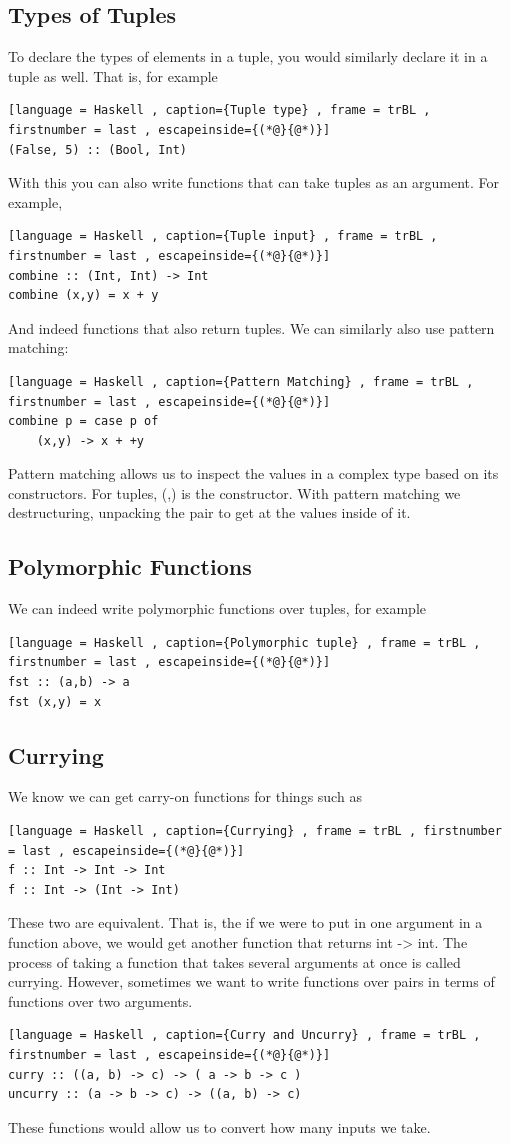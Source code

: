 \documentclass[a4paper]{article}
\theoremstyle{plain}
\theoremstyle{definition}
\theoremstyle{remark}
\begin{document}
\subsection{Types of Tuples}
To declare the types of elements in a tuple, you would similarly declare it in a tuple as well. That is, for example	
\begin{lstlisting}[language = Haskell , caption={Tuple type} , frame = trBL , firstnumber = last , escapeinside={(*@}{@*)}]
(False, 5) :: (Bool, Int)
\end{lstlisting}
With this you can also write functions that can take tuples as an argument. For example,
\begin{lstlisting}[language = Haskell , caption={Tuple input} , frame = trBL , firstnumber = last , escapeinside={(*@}{@*)}]
combine :: (Int, Int) -> Int
combine (x,y) = x + y
\end{lstlisting}
And indeed functions that also return tuples.
We can similarly also use pattern matching:
\begin{lstlisting}[language = Haskell , caption={Pattern Matching} , frame = trBL , firstnumber = last , escapeinside={(*@}{@*)}]
combine p = case p of
	(x,y) -> x + +y
\end{lstlisting}
Pattern matching allows us to inspect the values in a complex type based on its constructors. For tuples, (,) is the constructor. With pattern matching we destructuring, unpacking the pair to get at the values inside of it.
\subsection{Polymorphic Functions}
We can indeed write polymorphic functions over tuples, for example
\begin{lstlisting}[language = Haskell , caption={Polymorphic tuple} , frame = trBL , firstnumber = last , escapeinside={(*@}{@*)}]
fst :: (a,b) -> a
fst (x,y) = x
\end{lstlisting}
\subsection{Currying}
We know we can get carry-on functions for things such as
\begin{lstlisting}[language = Haskell , caption={Currying} , frame = trBL , firstnumber = last , escapeinside={(*@}{@*)}]
f :: Int -> Int -> Int
f :: Int -> (Int -> Int)
\end{lstlisting}
These two are equivalent. That is, the if we were to put in one argument in a function above, we would get another function that returns int -> int.
The process of taking a function that takes several arguments at once is called currying. However, sometimes we want to write functions over pairs in terms of functions over two arguments. 
\begin{lstlisting}[language = Haskell , caption={Curry and Uncurry} , frame = trBL , firstnumber = last , escapeinside={(*@}{@*)}]
curry :: ((a, b) -> c) -> ( a -> b -> c )
uncurry :: (a -> b -> c) -> ((a, b) -> c)
\end{lstlisting}
These functions would allow us to convert how many inputs we take. 
\end{document}
